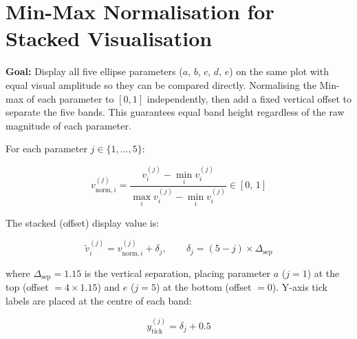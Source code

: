 \documentclass{article}
\begin{document}
%	
%	
%	
%	
%	
%	
	

	\section{Min-Max Normalisation for Stacked Visualisation}

	
	\textbf{Goal:} Display all five ellipse parameters
	($a$, $b$, $c$, $d$, $e$) on the same plot with equal
	visual amplitude so they can be compared directly.
	Normalising the Min-max of each parameter to $[0,1]$
	independently, then add a fixed vertical offset to
	separate the five bands.
	This guarantees equal band height regardless of the
	raw magnitude of each parameter.
	
	For each parameter $j \in \{1,\ldots,5\}$:
	
	\begin{equation}
		v_{\text{norm},i}^{(j)}
		= \frac{v_i^{(j)} - \min_i v_i^{(j)}}
		{\max_i v_i^{(j)} - \min_i v_i^{(j)}}
		\in [0,\, 1]
	\end{equation}
	
	The stacked (offset) display value is:
	
	\begin{equation}
		\tilde{v}_i^{(j)} = v_{\text{norm},i}^{(j)} + \delta_j, \qquad
		\delta_j = (5 - j) \times \Delta_{\text{sep}}
	\end{equation}
	
	where $\Delta_{\text{sep}} = 1.15$ is the vertical separation,
	placing parameter $a$ ($j=1$) at the top (offset $= 4\times1.15$)
	and $e$ ($j=5$) at the bottom (offset $= 0$).
	Y-axis tick labels are placed at the centre of each band:
	
	\begin{equation}
		y_{\text{tick}}^{(j)} = \delta_j + 0.5
	\end{equation}
	
\end{document}
